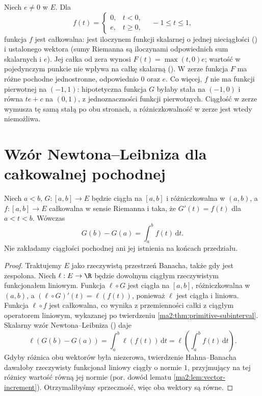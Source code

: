 \begin{przyklad}
\label{ma2:ex:primitive-jump}
Niech $e\ne0$ w $E$. Dla
\[
 f(t)=
 \begin{cases}0,&t<0,\\ e,&t\ge0,\end{cases}
 \quad -1\le t\le1,
\]
funkcja $f$ jest całkowalna: jest iloczynem
funkcji skalarnej o jednej nieciągłości
()
i ustalonego wektora (sumy Riemanna są
iloczynami odpowiednich sum skalarnych i $e$).
Jej całka od zera wynosi $F(t)=\max(t,0)e$;
wartość w pojedynczym punkcie nie wpływa na
całkę skalarną
().
W zerze funkcja $F$ ma różne pochodne
jednostronne, odpowiednio $0$ oraz $e$.
Co więcej, $f$ nie ma funkcji pierwotnej
na $(-1,1)$: hipotetyczna funkcja $G$
byłaby stała na $(-1,0)$ i równa $te+c$
na $(0,1)$, z jednoznaczności funkcji pierwotnych.
Ciągłość w zerze wymusza tę samą stałą po obu
stronach, a różniczkowalność w zerze jest
wtedy niemożliwa.
\end{przyklad}

\section{Wzór Newtona--Leibniza dla całkowalnej pochodnej}

\begin{twierdzenie}
\label{ma2:thm:primitive-newton-leibniz}
Niech $a<b$, $G:[a,b]\to E$ będzie ciągła
na $[a,b]$ i różniczkowalna w $(a,b)$,
a $f:[a,b]\to E$ całkowalna w sensie Riemanna
i taka, że $G'(t)=f(t)$ dla $a<t<b$.
Wówczas
\[
 G(b)-G(a)=\int_a^b f(t)\,\mathrm dt.
\]
Nie zakładamy ciągłości pochodnej ani jej
istnienia na końcach przedziału.
\end{twierdzenie}
\begin{proof}
Traktujemy $E$ jako rzeczywistą przestrzeń
Banacha, także gdy jest zespolona. Niech
$\ell:E\to\R$ będzie dowolnym ciągłym
rzeczywistym funkcjonałem liniowym.
Funkcja $\ell\circ G$ jest ciągła na $[a,b]$,
różniczkowalna w $(a,b)$, a
$(\ell\circ G)'(t)=\ell(f(t))$, ponieważ
$\ell$ jest ciągła i liniowa.
Funkcja $\ell\circ f$ jest całkowalna,
co wynika z przemienności całki z ciągłym
operatorem liniowym, wykazanej po twierdzeniu
\ref{ma2:thm:primitive-subinterval}.
Skalarny wzór Newtona--Leibniza
()
daje
\[
 \ell(G(b)-G(a))
 =\int_a^b\ell(f(t))\,\mathrm dt
 =\ell\left(\int_a^b f(t)\,\mathrm dt\right).
\]
Gdyby różnica obu wektorów była niezerowa,
twierdzenie Hahna--Banacha dawałoby rzeczywisty
funkcjonał liniowy ciągły o normie $1$,
przyjmujący na tej różnicy wartość równą
jej normie (por. dowód lematu
\ref{ma2:lem:vector-increment}).
Otrzymalibyśmy sprzeczność, więc oba wektory
są równe.
\end{proof}


